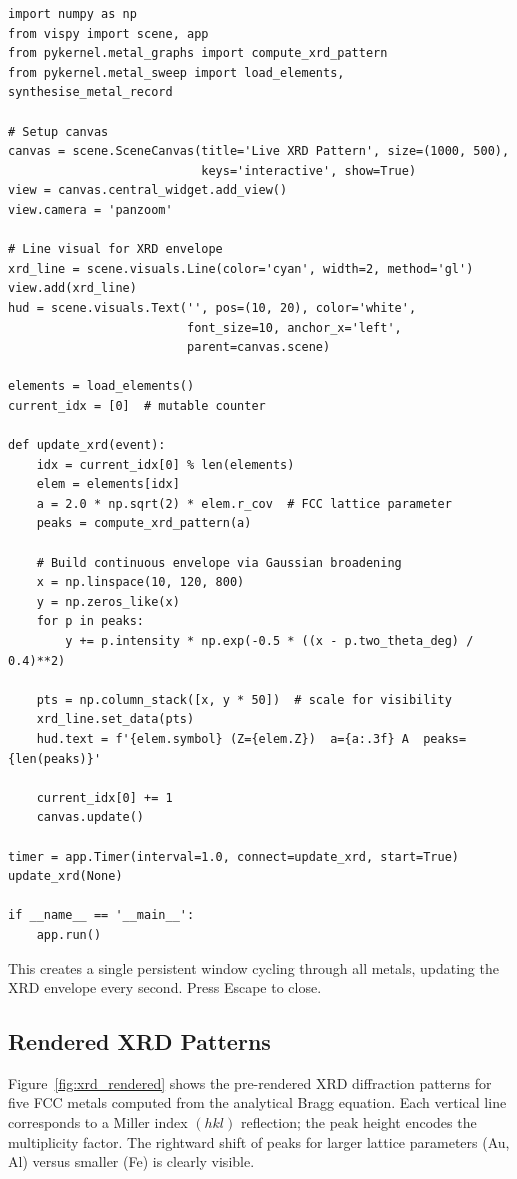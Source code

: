\documentclass[11pt,a4paper]{article}
\begin{document}
\begin{lstlisting}[title={\textbf{Live XRD Inspection Window}}]
import numpy as np
from vispy import scene, app
from pykernel.metal_graphs import compute_xrd_pattern
from pykernel.metal_sweep import load_elements, synthesise_metal_record

# Setup canvas
canvas = scene.SceneCanvas(title='Live XRD Pattern', size=(1000, 500),
                           keys='interactive', show=True)
view = canvas.central_widget.add_view()
view.camera = 'panzoom'

# Line visual for XRD envelope
xrd_line = scene.visuals.Line(color='cyan', width=2, method='gl')
view.add(xrd_line)
hud = scene.visuals.Text('', pos=(10, 20), color='white',
                         font_size=10, anchor_x='left',
                         parent=canvas.scene)

elements = load_elements()
current_idx = [0]  # mutable counter

def update_xrd(event):
    idx = current_idx[0] % len(elements)
    elem = elements[idx]
    a = 2.0 * np.sqrt(2) * elem.r_cov  # FCC lattice parameter
    peaks = compute_xrd_pattern(a)

    # Build continuous envelope via Gaussian broadening
    x = np.linspace(10, 120, 800)
    y = np.zeros_like(x)
    for p in peaks:
        y += p.intensity * np.exp(-0.5 * ((x - p.two_theta_deg) / 0.4)**2)

    pts = np.column_stack([x, y * 50])  # scale for visibility
    xrd_line.set_data(pts)
    hud.text = f'{elem.symbol} (Z={elem.Z})  a={a:.3f} A  peaks={len(peaks)}'

    current_idx[0] += 1
    canvas.update()

timer = app.Timer(interval=1.0, connect=update_xrd, start=True)
update_xrd(None)

if __name__ == '__main__':
    app.run()
\end{lstlisting}

This creates a single persistent window cycling through all metals,
updating the XRD envelope every second.  Press Escape to close.

\subsection{Rendered XRD Patterns}

Figure~\ref{fig:xrd_rendered} shows the pre-rendered XRD diffraction
patterns for five FCC metals computed from the analytical Bragg equation.
Each vertical line corresponds to a Miller index $(hkl)$ reflection;
the peak height encodes the multiplicity factor.  The rightward shift
of peaks for larger lattice parameters (Au, Al) versus smaller (Fe)
is clearly visible.
\end{document}
